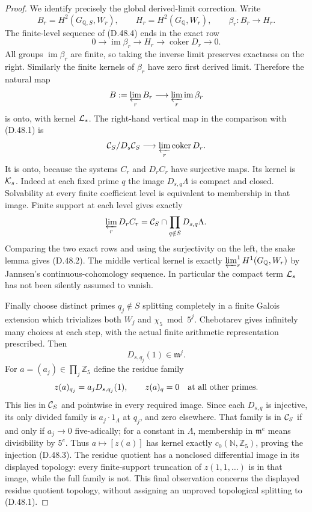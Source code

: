 \begin{proof}
We identify precisely the global
derived-limit correction. Write
\[
 B_r=H^2(G_{\mathbb Q,S},W_r),\qquad
 H_r=H^2(G_{\mathbb Q},W_r),\qquad
 \beta_r:B_r\longrightarrow H_r .
 \]
The finite-level sequence of (D.48.4)
ends in the exact row
\[
 0\longrightarrow\operatorname{im}\beta_r
   \longrightarrow H_r
   \longrightarrow\operatorname{coker}D_r
   \longrightarrow0 .
 \]
All groups \(\operatorname{im}\beta_r\)
are finite, so taking the inverse
limit preserves exactness on the right.
Similarly the finite kernels of
\(\beta_r\) have zero first derived
limit. Therefore the natural map
\[
 B:=\varprojlim_rB_r
              \longrightarrow
                \varprojlim_r\operatorname{im}\beta_r
 \]
is onto, with kernel \({\cal L}_s\).
The right-hand vertical map in the
comparison with (D.48.1) is
\[
 {\cal C}_S/D_s{\cal C}_S
              \longrightarrow
                   \varprojlim_r\operatorname{coker}D_r .
 \]
It is onto, because the systems \(C_r\)
and \(D_rC_r\) have surjective maps.
Its kernel is \({\cal K}_s\).
Indeed at each fixed prime \(q\)
the image \(D_{s,q}\Lambda\) is
compact and closed. Solvability
at every finite coefficient level
is equivalent to membership in
that image. Finite support at each
level gives exactly
\[
       \varprojlim_rD_rC_r
            ={\cal C}_S\cap
                  \prod_{q\notin S}D_{s,q}\Lambda .
 \]
Comparing the two exact rows and
using the surjectivity on the left,
the snake lemma gives (D.48.2).
The middle vertical kernel is
exactly
\(\varprojlim^1_rH^1(G_{\mathbb Q},W_r)\)
by Jannsen's continuous-cohomology
sequence. In particular the compact
term \({\cal L}_s\) has not been
silently assumed to vanish.

Finally choose distinct primes
\(q_j\notin S\) splitting completely
in a finite Galois extension which
trivializes both \(W_j\) and
\(\chi_5\bmod5^j\). Chebotarev
gives infinitely many choices at
each step, with the actual finite
arithmetic representation prescribed.
Then
\[
                      D_{s,q_j}(1)\in\mathfrak m^j .
 \]
For \(a=(a_j)\in\prod_j\mathbb Z_5\)
define the residue family
\[
 z(a)_{q_j}=a_jD_{s,q_j}(1),\qquad
 z(a)_q=0\quad\hbox{at all other primes}.
 \]
This lies in \({\cal C}_S\) and
pointwise in every required image.
Since each \(D_{s,q}\) is injective,
its only divided family is
\(a_j\cdot1_\Lambda\) at \(q_j\),
and zero elsewhere. That family
is in \({\cal C}_S\) if and only if
\(a_j\to0\) five-adically; for a
constant in \(\Lambda\),
membership in \(\mathfrak m^e\)
means divisibility by \(5^e\).
Thus \(a\mapsto[z(a)]\) has kernel
exactly \(c_0(\mathbb N,\mathbb Z_5)\),
proving the injection (D.48.3).
The residue quotient has a
nonclosed differential image in
its displayed topology: every
finite-support truncation of
\(z(1,1,\ldots)\) is in that
image, while the full family
is not. This final observation
concerns the displayed residue
quotient topology, without
assigning an unproved topological
splitting to (D.48.1).
\end{proof}

